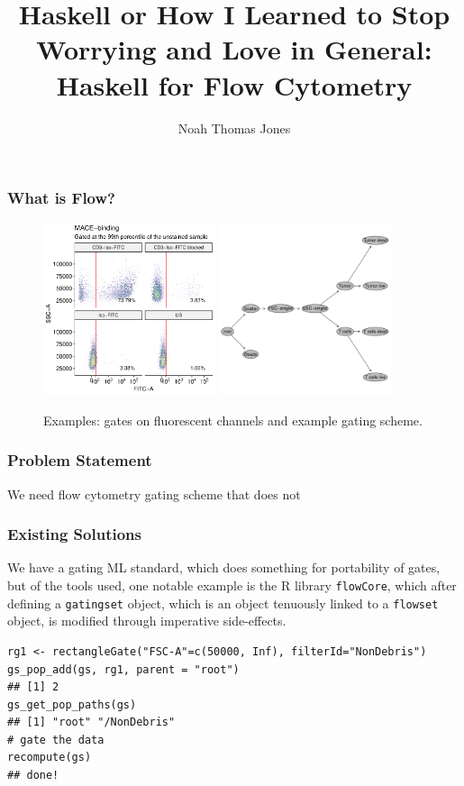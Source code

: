 \documentclass{beamer}
\title{Haskell or How I Learned to Stop Worrying and Love in General: Haskell for Flow Cytometry}
\author{Noah Thomas Jones}
\institute{University of Florida}
\date{}
\begin{document}
\frame{\titlepage}
\begin{frame}
  \frametitle{What is Flow?}
  \begin{figure}
    \centering
    \includegraphics[width=0.45\textwidth]{./images/NJ030_MACE-binding.pdf}
    \includegraphics[width=0.45\textwidth]{./images/NJ017_gates.pdf}
    \caption{Examples: gates on fluorescent channels and
      example gating scheme.}
  \end{figure}
\end{frame}
\begin{frame}
  \frametitle{Problem Statement}
  We need flow cytometry gating scheme that does not
\end{frame}
\begin{frame}[fragile]
  \frametitle{Existing Solutions} We have a gating ML
  standard\cite{spidlen2015isac}, which does something for portability
  of gates, but of the tools used, one notable example is the R
  library \texttt{flowCore}, which after defining a \texttt{gatingset} object,
  which is an object tenuously linked to a \texttt{flowset} object, is
  modified through imperative side-effects.
\begin{lstlisting}
rg1 <- rectangleGate("FSC-A"=c(50000, Inf), filterId="NonDebris")
gs_pop_add(gs, rg1, parent = "root")
## [1] 2
gs_get_pop_paths(gs)
## [1] "root" "/NonDebris"
# gate the data
recompute(gs)
## done!
\end{lstlisting}
\end{frame}
\end{document}
